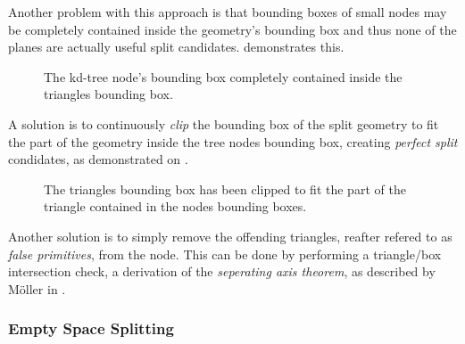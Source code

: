 Another problem with this approach is that bounding boxes of small
nodes may be completely contained inside the geometry's bounding box
and thus none of the planes are actually useful split
candidates.  demonstrates this.

\begin{figure}
  \centering
  \caption[A tree node's bounding box contained in a triangle's
    bounding box.]{The kd-tree node's bounding box completely
    contained inside the triangles bounding box.}
  \label{fig:aabbContained}
\end{figure}

A solution is to continuously \textit{clip} the bounding box of the
split geometry to fit the part of the geometry inside the tree nodes
bounding box, creating \textit{perfect split} condidates, as
demonstrated on .

\begin{figure}
  \centering
  \caption[Triangle clipping.]{The triangles bounding box has been
    clipped to fit the part of the triangle contained in the nodes
    bounding boxes.}
  \label{fig:aabbClipped}
\end{figure}

Another solution is to simply remove the offending triangles, reafter
refered to as \textit{false primitives}, from the node. This can be
done by performing a triangle/box intersection check, a derivation of
the \textit{seperating axis theorem}, as described by Möller in
.


\subsubsection{Empty Space Splitting}

